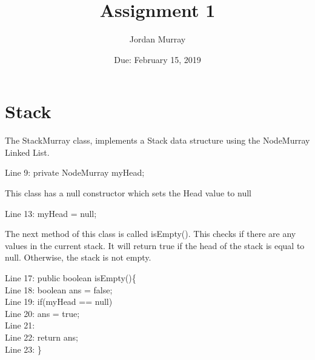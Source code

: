\documentclass{article}
\title{Assignment 1}
\author{Jordan Murray}
\date{Due: February 15, 2019}
\begin{document}
\maketitle

\section{Stack}

\noindent
The StackMurray class, implements a Stack data structure using the NodeMurray Linked List.

\vspace{2em}
    \hspace*{1.5em}Line 9: private NodeMurray myHead;
\vspace{2em}

\noindent
This class has a null constructor which sets the Head value to null

\vspace{2em}
    \hspace*{1.5em}Line 13: myHead = null;\\
\vspace{2em}

\noindent
The next method of this class is called isEmpty(). This checks if there are any values in the current stack. It will return true if the head of the stack is equal to null. Otherwise, the stack is not empty.

\vspace{2em}
 Line 17: public boolean isEmpty()\{\\
	\hspace*{1.5em}Line 18:\hspace*{1em} boolean ans = false;\\
	\hspace*{1.5em}Line 19: \hspace*{1em} if(myHead == null)\\
	\hspace*{1.5em}Line 20: \hspace*{2em}ans = true;\\
    \hspace*{1.5em}Line 21: \\
	\hspace*{1.5em}Line 22:\hspace*{1em} return ans;\\
	\hspace*{1.5em}Line 23: \}\\
\vspace{2em}
\end{document}
